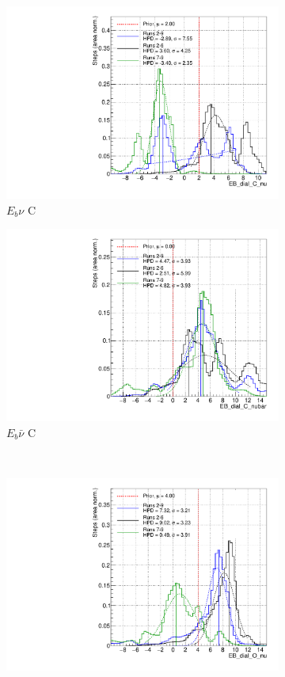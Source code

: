 \begin{figure}
\centering
\begin{subfigure}{.48\textwidth}
  \centering
  \includegraphics[width=0.73\linewidth]{figs/Runs_EB_dial_C_nu}
  \caption{$E_{b}\nu$ C}
\end{subfigure}
\begin{subfigure}{.48\textwidth}
  \centering
  \includegraphics[width=0.73\linewidth]{figs/Runs_EB_dial_C_nubar}
  \caption{$E_{b}\bar{\nu}$ C}
\end{subfigure} \\
\begin{subfigure}{.48\textwidth}
  \centering
  \includegraphics[width=0.73\linewidth]{figs/Runs_EB_dial_O_nu}

\end{subfigure}
\end{figure}
